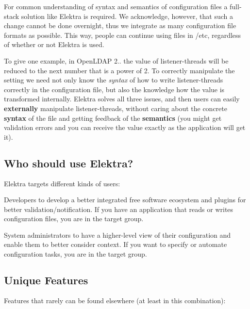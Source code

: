For common understanding of syntax and semantics of configuration files a full-\/stack solution like Elektra is required. We acknowledge, however, that such a change cannot be done overnight, thus we integrate as many configuration file formats as possible. This way, people can continue using files in {\ttfamily /etc}, regardless of whether or not Elektra is used.

To give one example, in Open\+L\+D\+A\+P 2.. the value of {\ttfamily listener-\/threads} will be reduced to the next number that is a power of 2. To correctly manipulate the setting we need not only know the {\itshape syntax} of how to write listener-\/threads correctly in the configuration file, but also the knowledge how the value is transformed internally. Elektra solves all three issues, and then users can easily {\bfseries externally} manipulate {\ttfamily listener-\/threads}, without caring about the concrete {\bfseries syntax} of the file and getting feedback of the {\bfseries semantics} (you might get validation errors and you can receive the value exactly as the application will get it).

\subsection*{Who should use Elektra?}

Elektra targets different kinds of users\+:


\begin{DoxyEnumerate}
\item Developers to develop a better integrated free software ecosystem and plugins for better validation/notification. If you have an application that reads or writes configuration files, you are in the target group.
\item System administrators to have a higher-\/level view of their configuration and enable them to better consider context. If you want to specify or automate configuration tasks, you are in the target group.
\end{DoxyEnumerate}

\subsection*{Unique Features}

Features that rarely can be found elsewhere (at least in this combination)\+:


